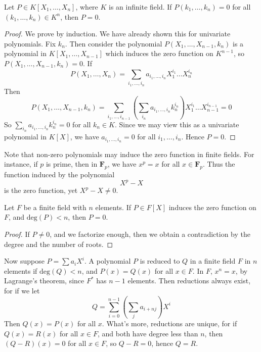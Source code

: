 \begin{corollary}
    Let $P \in K[X_1, \dots, X_n]$, where $K$ is an infinite field. If $P(k_1, \dots, k_n) = 0$ for all $(k_1, \dots, k_n) \in K^n$, then $P = 0$.
\end{corollary}
\begin{proof}
    We prove by induction. We have already shown this for univariate polynomials. Fix $k_n$. Then consider the polynomial $P(X_1, \dots, X_{n-1}, k_n)$ is a polynomial in $K[X_1, \dots, X_{n-1}]$ which induces the zero function on $K^{n-1}$, so $P(X_1, \dots, X_{n-1}, k_n) = 0$. If
    \[ P(X_1, \dots, X_n) = \sum_{i_1, \dots, i_n} a_{i_1, \dots, i_n} X_1^{i_1} \dots X_n^{i_n} \]
    Then
    \[ P(X_1, \dots, X_{n-1}, k_n) = \sum_{i_1, \dots, i_{n-1}} \left(\sum_{i_n} a_{i_1, \dots, i_n} k_n^{i_n} \right) X_1^{i_1} \dots X_{n-1}^{i_{n-1}} = 0 \]
    So $\sum_{i_n} a_{i_1, \dots, i_n} k_n^{i_n} = 0$ for all $k_n \in K$. Since we may view this as a univariate polynomial in $K[X]$, we have $a_{i_1, \dots, i_n} = 0$ for all $i_1, \dots, i_n$. Hence $P = 0$.
\end{proof}

Note that non-zero polynomials may induce the zero function in finite fields. For instance, if $p$ is prime, then in $\mathbf{F}_p$, we have $x^p = x$ for all $x \in \mathbf{F}_p$. Thus the function induced by the polynomial
%
\[ X^p - X \]
%
is the zero function, yet $X^p - X \neq 0$.

\begin{lemma}
    Let $F$ be a finite field with $n$ elements. If $P \in F[X]$ induces the zero function on $F$, and $\text{deg}(P) < n$, then $P = 0$.
\end{lemma}
\begin{proof}
    If $P \neq 0$, and we factorize enough, then we obtain a contradiction by the degree and the number of roots.
\end{proof}

Now suppose $P = \sum a_i X^i$. A polynomial $P$ is reduced to $Q$ in a finite field $F$ in $n$ elements if $\text{deg}(Q) < n$, and $P(x) = Q(x)$ for all $x \in F$. In $F$, $x^n = x$, by Lagrange's theorem, since $F^*$ has $n-1$ elements. Then reductions always exist, for if we let
%
\[ Q = \sum_{i = 0}^{n-1} \left( \sum_j a_{i + nj} \right) X^i \]
%
Then $Q(x) = P(x)$ for all $x$. What's more, reductions are unique, for if $Q(x) = R(x)$ for all $x \in F$, and both have degree less than $n$, then $(Q - R)(x) = 0$ for all $x \in F$, so $Q - R = 0$, hence $Q = R$.




